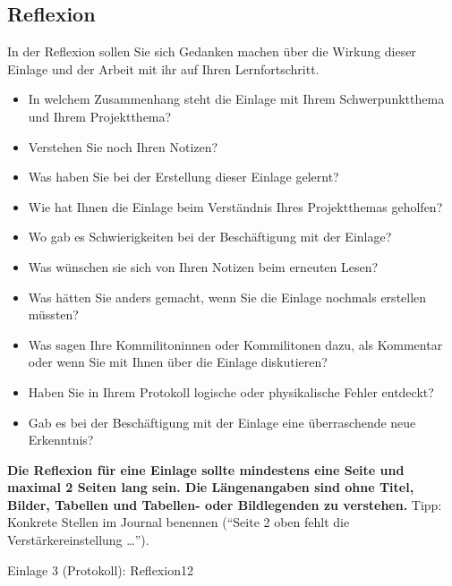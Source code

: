 \subsection{Reflexion}
\begin{hinweise}
In der Reflexion sollen Sie sich Gedanken machen über die Wirkung dieser Einlage und der Arbeit mit ihr auf
Ihren Lernfortschritt.
\begin{itemize}\itemsep0pt
\item In welchem Zusammenhang steht die Einlage mit Ihrem Schwerpunktthema und Ihrem Projektthema?
\item Verstehen Sie noch Ihren Notizen?
\item Was haben Sie bei der Erstellung dieser Einlage gelernt?
\item Wie hat Ihnen die Einlage beim Verständnis Ihres Projektthemas geholfen?
\item Wo gab es Schwierigkeiten bei der Beschäftigung mit der Einlage?
\item Was wünschen sie sich von Ihren Notizen beim erneuten Lesen?
\item Was hätten Sie anders gemacht, wenn Sie die Einlage nochmals erstellen müssten?
\item Was sagen Ihre Kommilitoninnen oder Kommilitonen dazu, als Kommentar oder wenn Sie mit Ihnen über die Einlage diskutieren?
\item Haben Sie in Ihrem Protokoll logische oder physikalische Fehler entdeckt?
\item Gab es bei der Beschäftigung mit der Einlage eine überraschende neue Erkenntnis?
\end{itemize}
\textbf{Die Reflexion für eine Einlage sollte mindestens eine Seite und maximal 2 Seiten lang sein. Die
Längenangaben sind ohne Titel, Bilder, Tabellen und Tabellen- oder Bildlegenden zu verstehen.}
Tipp: Konkrete Stellen im Journal benennen (\enquote{Seite 2 oben fehlt die Verstärkereinstellung \dots}).
\end{hinweise}
\begin{umfang}{Einlage 3 (Protokoll): Reflexion}{1}{2}
\end{umfang}

